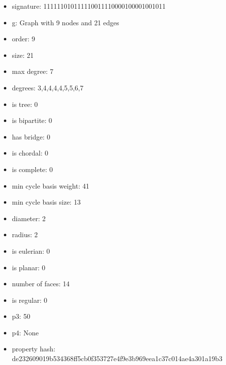 \newpage
\begin{figure}
\end{figure}
\begin{itemize}
\item signature: 111111010111110011110000100001001011
\item g: Graph with 9 nodes and 21 edges
\item order: 9
\item size: 21
\item max degree: 7
\item degrees: 3,4,4,4,4,5,5,6,7
\item is tree: 0
\item is bipartite: 0
\item has bridge: 0
\item is chordal: 0
\item is complete: 0
\item min cycle basis weight: 41
\item min cycle basis size: 13
\item diameter: 2
\item radius: 2
\item is eulerian: 0
\item is planar: 0
\item number of faces: 14
\item is regular: 0
\item p3: 50
\item p4: None
\item property hash: de232609019b534368ff5cb0f353727e4f9e3b969eea1c37c014ae4a301a19b3
\end{itemize}
